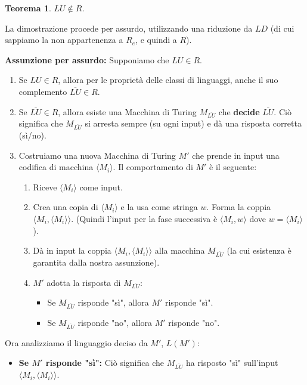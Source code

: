 \documentclass[a4paper]{article}
\makeatletter
\newtheorem{theorem}{Teorema}[section] %
\renewenvironment{proof}[1][\proofname]{\par
  \pushQED{\qed}%
  \normalfont \topsep6\p@\@plus6\p@\relax
  \trivlist
  \item[\hskip\labelsep
        \bfseries
    #1\@addpunct{.}]\ignorespaces
}{%
  \popQED\endtrivlist\@endpefalse
}
\makeatother
\begin{document}
\begin{theorem}
$LU \notin R$.
\end{theorem}
\begin{proof}
La dimostrazione procede per assurdo, utilizzando una riduzione da $LD$ (di cui sappiamo la non appartenenza a $R_e$, e quindi a $R$).

\textbf{Assunzione per assurdo:} Supponiamo che $LU \in R$.
\begin{enumerate}
    \item Se $LU \in R$, allora per le proprietà delle classi di linguaggi, anche il suo complemento $\overline{LU} \in R$.
    \item Se $\overline{LU} \in R$, allora esiste una Macchina di Turing $M_{\overline{LU}}$ che \textbf{decide} $\overline{LU}$. Ciò significa che $M_{\overline{LU}}$ si arresta sempre (su ogni input) e dà una risposta corretta (sì/no).
    \item Costruiamo una nuova Macchina di Turing $M'$ che prende in input una codifica di macchina $\langle M_i \rangle$. Il comportamento di $M'$ è il seguente:
    \begin{enumerate}
        \item Riceve $\langle M_i \rangle$ come input.
        \item Crea una copia di $\langle M_i \rangle$ e la usa come stringa $w$. Forma la coppia $\langle M_i, \langle M_i \rangle \rangle$. (Quindi l'input per la fase successiva è $\langle M_i, w \rangle$ dove $w = \langle M_i \rangle$).
        \item Dà in input la coppia $\langle M_i, \langle M_i \rangle \rangle$ alla macchina $M_{\overline{LU}}$ (la cui esistenza è garantita dalla nostra assunzione).
        \item $M'$ adotta la risposta di $M_{\overline{LU}}$:
        \begin{itemize}
            \item Se $M_{\overline{LU}}$ risponde "sì", allora $M'$ risponde "sì".
            \item Se $M_{\overline{LU}}$ risponde "no", allora $M'$ risponde "no".
        \end{itemize}
    \end{enumerate}
\end{enumerate}
Ora analizziamo il linguaggio deciso da $M'$, $L(M')$:
\begin{itemize}
    \item \textbf{Se $M'$ risponde "sì":}
    Ciò significa che $M_{\overline{LU}}$ ha risposto "sì" sull'input $\langle M_i, \langle M_i \rangle \rangle$.

\end{itemize}
\end{proof}
\end{document}
